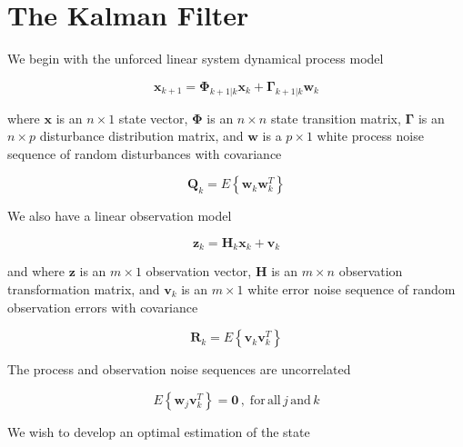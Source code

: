 \section{The Kalman Filter}
\label{The Kalman Filter}

We begin with the unforced linear system dynamical process model

\begin{equation}
    \mathbf{x}_{k+1} = \mathbf{\Phi}_{k+1|k} \mathbf{x}_k + \mathbf{\Gamma}_{k+1|k} \mathbf{w}_k
    \label{eq:unforced-linear-system-dynamical-model}
\end{equation}

where $\mathbf{x}$ is an $n \times 1$ state vector,
$\mathbf{\Phi}$ is an $n \times n$ state transition matrix,
$\mathbf{\Gamma}$ is an $n \times p$ disturbance distribution matrix,
and $\mathbf{w}$ is a $p \times 1$ white process noise sequence of random disturbances with covariance

\begin{equation}
    \mathbf{Q}_k = E \left\{ \mathbf{w}_k \mathbf{w}_k^T \right\}
    \label{eq:process-noise-covariance}
\end{equation}

We also have a linear observation model

\begin{equation}
    \mathbf{z}_k = \mathbf{H}_k \mathbf{x}_k + \mathbf{v}_k
    \label{eq:linear-system-observation-model}
\end{equation}

and where $\mathbf{z}$ is an $m \times 1$ observation vector,
$\mathbf{H}$ is an $m \times n$ observation transformation matrix,
and $\mathbf{v}_k$ is an $m \times 1$ white error noise sequence of random observation errors with covariance

\begin{equation}
    \mathbf{R}_k = E \left\{ \mathbf{v}_k \mathbf{v}_k^T \right\}
    \label{eq:observation-noise-covariance}
\end{equation}

The process and observation noise sequences are uncorrelated

\begin{equation*}
    E \left\{ \mathbf{w}_j \mathbf{v}_k^T \right\} = \mathbf{0} \, , \phantom{.} \mathrm{for} \, \mathrm{all} \, j \, \mathrm{and} \, k
\end{equation*}

We wish to develop an optimal estimation of the state

